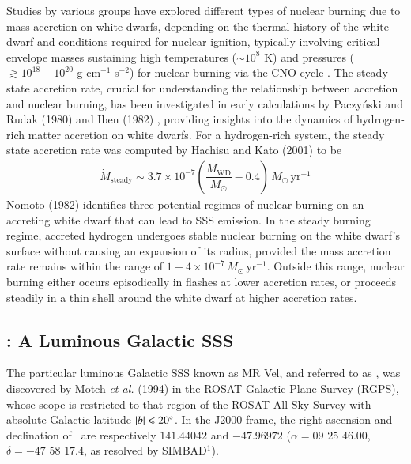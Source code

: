     Studies by various groups have explored different types of nuclear burning due to mass accretion on white dwarfs, depending on the thermal history of the white dwarf and conditions required for nuclear ignition, typically involving critical envelope masses %
    sustaining high temperatures ($\sim 10^8$ K) and pressures ($\gtrsim 10^{18}-10^{20}$ g cm$^{-1}$ s$^{-2}$) for nuclear burning via the CNO cycle \cite{paczynski78,prialnik78,sion79,sienkiewicz80,nomoto82,fujimoto82a,fujimoto82b,iben82,prialnik95,macdonald83}. The steady state accretion rate, crucial for understanding the relationship between accretion and nuclear burning, has been investigated in early calculations by Paczy\'{n}ski and Rudak (1980) \cite{paczynski80} and Iben (1982) \cite{iben82}, providing insights into the dynamics of hydrogen-rich matter accretion on white dwarfs. For a hydrogen-rich system, the steady state accretion rate was computed by Hachisu and Kato (2001) \cite{hachisu2001} to be
	\begin{align}
		\dot{M}_\text{steady}\sim 3.7\times 10^{-7}\left( \dfrac{M_\text{WD}}{M_\odot}-0.4 \right)\,M_\odot\,\text{yr}^{-1} \label{eqn:steady-mass-accr}
	\end{align}
	Nomoto (1982) \cite{nomoto82} identifies three potential regimes of nuclear burning on an accreting white dwarf that can lead to SSS emission. In the steady burning regime, accreted hydrogen undergoes stable nuclear burning on the white dwarf's surface without causing an expansion of its radius, provided the mass accretion rate remains within the range of $1-4\times 10^{-7}\,M_\odot\,\text{yr}^{-1}$. Outside this range, nuclear burning either occurs episodically in flashes at lower accretion rates, or proceeds steadily in a thin shell around the white dwarf at higher accretion rates. %
	
	\subsection{\source: A Luminous Galactic SSS}
	The particular luminous Galactic SSS known as MR Vel, and referred to as \source, was discovered by Motch \textit{et al.} (1994) \cite{motch1994} in the ROSAT Galactic Plane Survey (RGPS), whose scope is restricted to that region of the ROSAT All Sky Survey \cite{voges1993rosat} with absolute Galactic latitude $|b|\leqslant 20\degree$. In the J2000 frame, the right ascension and declination of \source\ are respectively $141.44042$ and $-47.96972$ ($\alpha=09$ $25$ $46.00$, $\delta=-47$ $58$ $17.4$, as resolved by SIMBAD$^1$).
	
